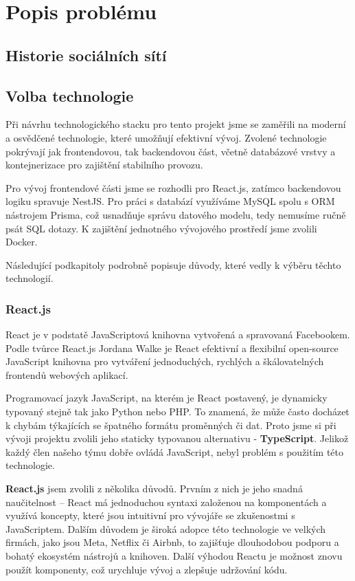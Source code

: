 \newpage

\section{Popis problému}


\subsection{Historie sociálních sítí}



\subsection{Volba technologie}  
Při návrhu technologického stacku pro tento projekt jsme se zaměřili na moderní a osvědčené technologie, které umožňují efektivní vývoj. Zvolené technologie pokrývají jak frontendovou, tak backendovou část, včetně databázové vrstvy a kontejnerizace pro zajištění stabilního provozu.  

Pro vývoj frontendové části jsme se rozhodli pro React.js, zatímco backendovou logiku spravuje NestJS. Pro práci s databází využíváme MySQL spolu s ORM nástrojem Prisma, což usnadňuje správu datového modelu, tedy nemusíme ručně psát SQL dotazy. K zajištění jednotného vývojového prostředí jsme zvolili Docker.  

Následující podkapitoly podrobně popisuje důvody, které vedly k výběru těchto technologií.
\subsubsection{React.js}
React je v podstatě JavaScriptová knihovna vytvořená a spravovaná Facebookem. Podle tvůrce React.js Jordana Walke je React efektivní a flexibilní open-source JavaScript knihovna pro vytváření jednoduchých, rychlých a škálovatelných frontendů webových aplikací.

Programovací jazyk JavaScript, na kterém je React postavený, je dynamicky typovaný stejně tak jako Python nebo PHP. To znamená, že může často docházet k chybám týkajících se špatného formátu proměnných či dat. Proto jsme si při vývoji projektu zvolili jeho staticky typovanou alternativu - \textbf{TypeScript}. Jelikož každý člen našeho týmu dobře ovládá JavaScript, nebyl problém s použitím této technologie.

\textbf{React.js} jsem zvolili z několika důvodů. Prvním z nich je jeho snadná naučitelnost – React má jednoduchou syntaxi založenou na komponentách a využívá koncepty, které jsou intuitivní pro vývojáře se zkušenostmi s JavaScriptem. Dalším důvodem je široká adopce této technologie ve velkých firmách, jako jsou Meta, Netflix či Airbnb, to zajišťuje dlouhodobou podporu a bohatý ekosystém nástrojů a knihoven. Další výhodou Reactu je možnost znovu použít komponenty, což urychluje vývoj a zlepšuje udržování kódu.

